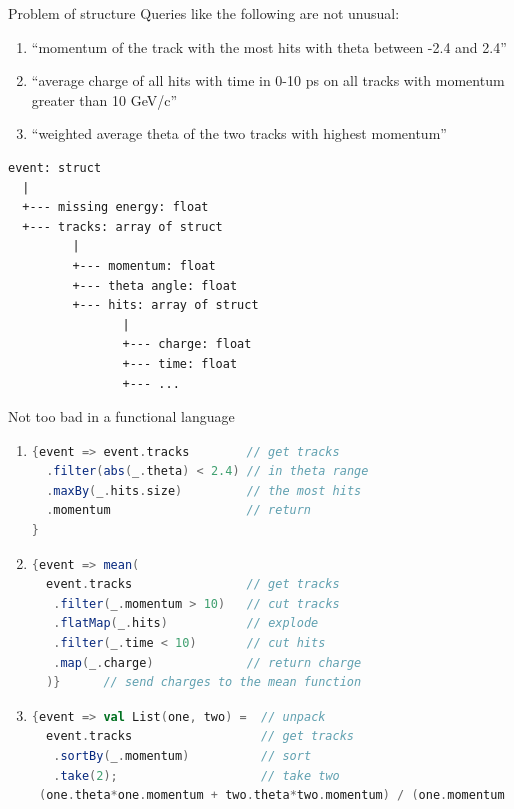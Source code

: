 \documentclass{beamer}
\begin{document}
\begin{frame}[fragile]{Problem of structure}
\vspace{0.5 cm}
Queries like the following are not unusual:
\begin{enumerate}
\item ``momentum of the track with the most hits with theta between -2.4 and 2.4''
\item ``average charge of all hits with time in 0-10 ps on all tracks with momentum greater than 10 GeV/c''
\item ``weighted average theta of the two tracks with highest momentum''
\end{enumerate}

\scriptsize
\begin{verbatim}
event: struct
  |
  +--- missing energy: float
  +--- tracks: array of struct
         |
         +--- momentum: float
         +--- theta angle: float
         +--- hits: array of struct
                |
                +--- charge: float
                +--- time: float
                +--- ...
\end{verbatim}
\end{frame}

\begin{frame}[fragile]{Not too bad in a functional language}
\vspace{0.1 cm}
\begin{enumerate}
\item

\begin{lstlisting}[language=scala]
{event => event.tracks        // get tracks
  .filter(abs(_.theta) < 2.4) // in theta range
  .maxBy(_.hits.size)         // the most hits
  .momentum                   // return
}
\end{lstlisting}

\item

\begin{lstlisting}[language=scala]
{event => mean(
  event.tracks                // get tracks
   .filter(_.momentum > 10)   // cut tracks
   .flatMap(_.hits)           // explode
   .filter(_.time < 10)       // cut hits
   .map(_.charge)             // return charge
  )}      // send charges to the mean function
\end{lstlisting}

\item

\begin{lstlisting}[language=scala]
{event => val List(one, two) =  // unpack
  event.tracks                  // get tracks
   .sortBy(_.momentum)          // sort
   .take(2);                    // take two
 (one.theta*one.momentum + two.theta*two.momentum) / (one.momentum + two.momentum)}
\end{lstlisting}
\end{enumerate}
\end{frame}
\end{document}
